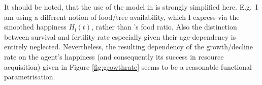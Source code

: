 It should be noted, that the use of the model in \citet{Puleston2017} is strongly simplified here.
E.g.\ I am using a different notion of food/tree availability, which I express via the smoothed happiness $H_\text{i}(t)$, rather than \citet{Puleston2017}'s food ratio.
Also the distinction between survival and fertility rate especially given their age-dependency is entirely neglected.
Nevertheless, the resulting dependency of the growth/decline rate on the agent's happiness (and consequently its success in resource acquisition) given in Figure \ref{fig:growthrate} seems to be a reasonable functional parametrisation. 

